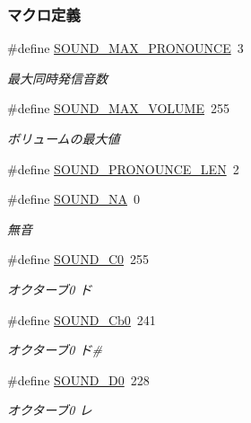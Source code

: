 \subsubsection*{マクロ定義}
\begin{DoxyCompactItemize}
\item 
\#define \hyperlink{sound_8h_ae37af07d650f8e823223bfaf85dfeea5_ae37af07d650f8e823223bfaf85dfeea5}{S\+O\+U\+N\+D\+\_\+\+M\+A\+X\+\_\+\+P\+R\+O\+N\+O\+U\+N\+C\+E}~3
\begin{DoxyCompactList}\small\item\em 最大同時発信音数 \end{DoxyCompactList}\item 
\#define \hyperlink{sound_8h_a46743b97361463957ee0eb2202ff90d8_a46743b97361463957ee0eb2202ff90d8}{S\+O\+U\+N\+D\+\_\+\+M\+A\+X\+\_\+\+V\+O\+L\+U\+M\+E}~255
\begin{DoxyCompactList}\small\item\em ボリュームの最大値 \end{DoxyCompactList}\item 
\#define \hyperlink{sound_8h_aa5c5d06e5ffe7f4792f2a7613223b8bb_aa5c5d06e5ffe7f4792f2a7613223b8bb}{S\+O\+U\+N\+D\+\_\+\+P\+R\+O\+N\+O\+U\+N\+C\+E\+\_\+\+L\+E\+N}~2
\item 
\#define \hyperlink{sound_8h_a00e51ccb7bab9d21f8cd5611028ca051_a00e51ccb7bab9d21f8cd5611028ca051}{S\+O\+U\+N\+D\+\_\+\+N\+A}~0
\begin{DoxyCompactList}\small\item\em 無音 \end{DoxyCompactList}\item 
\#define \hyperlink{sound_8h_a7a8291aa331919d505eb896f5f23b84c_a7a8291aa331919d505eb896f5f23b84c}{S\+O\+U\+N\+D\+\_\+\+C0}~255
\begin{DoxyCompactList}\small\item\em オクターブ0 ド \end{DoxyCompactList}\item 
\#define \hyperlink{sound_8h_a5cf7b47c621b7f44cb936a18e7a227be_a5cf7b47c621b7f44cb936a18e7a227be}{S\+O\+U\+N\+D\+\_\+\+Cb0}~241
\begin{DoxyCompactList}\small\item\em オクターブ0 ド\# \end{DoxyCompactList}\item 
\#define \hyperlink{sound_8h_a78855daec2050679bd8ef984b6474384_a78855daec2050679bd8ef984b6474384}{S\+O\+U\+N\+D\+\_\+\+D0}~228
\begin{DoxyCompactList}\small\item\em オクターブ0 レ \end{DoxyCompactList}\item 

\end{DoxyCompactItemize}
